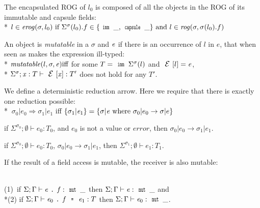 The encapsulated ROG of $l_0$ is composed of all the objects
in the ROG of its immutable and capsule fields:\\*
\indent $l \in \mathit{erog}(\sigma,l_0)
\text{ if } \Sigma^\sigma(l_0).f \in \{\Kw{imm}\,\_,\Kw{capsule}\,\_\}
\text{ and } l \in \mathit{rog}(\sigma,\sigma(l_0).f)
$\loseSpace

\noindent An object is \emph{mutatable} in a $\sigma$ and  ${\mathit{e}}$ if there is an occurrence of 
$l$ in $e$, that when seen as \Q@imm@ makes the expression ill-typed:\\*
$\mathit{mutatable}(l,\sigma,\e) \text{iff}$ for some $T=\Kw{imm}\,\Sigma^\sigma(l)$ and $\ctx[l]=\e$,\\*
\indent $\Sigma^\sigma;\x:T\vdash\ctx[\x]:T'$ does not hold for any $T'$.\loseSpace

\noindent We define
a deterministic reduction arrow.
Here we require that there is exactly one reduction possible:\\*
\indent$\ \sigma_0|e_0\Rightarrow \sigma_1|e_1$ iff $\{\sigma_1|\e_1\}=\{\sigma|\e \text{ where } \sigma_0|e_0\rightarrow \sigma|e\}$



\begin{Assumption}[Progress]
if $\Sigma^{\sigma_0};\emptyset\vdash e_0: T_0$,
and $e_0$ is not a value or $\mathit{error}$, then
$\sigma_0|e_0\rightarrow \sigma_1|e_1$.
\end{Assumption}


\begin{Assumption}
if $\Sigma^{\sigma_0};\emptyset\vdash e_0: T_0$,
$\sigma_0|e_0\rightarrow \sigma_1|e_1$,
then
$\Sigma^{\sigma_1};\emptyset\vdash e_1: T_1$.
\end{Assumption}


\noindent If the result of a field access is mutable,
the receiver is also mutable:\saveSpace\saveSpace
\begin{Assumption}
\ \\
\indent(1)\ if $\Sigma;\Gamma\vdash\e\singleDot\f:\Kw{mut}\,\_$
then $\Sigma;\Gamma\vdash\e:\Kw{mut}\,\_$
 and 
\\*\indent(2)
if $\Sigma;\Gamma\vdash\e_0\singleDot\f\equals\e_1:T$
then $\Sigma;\Gamma\vdash\e_0:\Kw{mut}\,\_$.
\end{Assumption}

